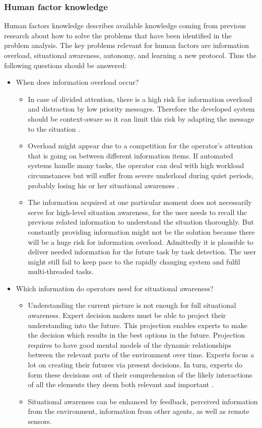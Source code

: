 \subsubsection{Human factor knowledge}
Human factors knowledge describes available knowledge coming from previous research about how to solve the problems that have been identified in the problem analysis. The key problems relevant for human factors are information overload, situational awareness, autonomy, and learning a new protocol. Thus the following questions should be answered:
\begin{itemize}
	\item When does information overload occur?
	\begin{itemize}
		\item In case of divided attention, there is a high risk for information overload and distraction by low priority messages. Therefore the developed system should be context-aware so it can limit this risk by adapting the message to the situation \cite{Arimura2001}.
		\item Overload might appear due to a competition for the operator’s attention that is going on between different information items. If automated systems handle many tasks, the operator can deal with high workload circumstances but will suffer from severe underload during quiet periods, probably losing his or her situational awareness \cite{Neerincx2008}.
		\item The information acquired at one particular moment does not necessarily serve for high-level situation awareness, for the user needs to recall the previous related information to understand the situation thoroughly. But constantly providing information might not be the solution because there will be a huge risk for information overload. Admittedly it is plausible to deliver needed information for the future task by task detection. The user might still fail to keep pace to the rapidly changing system and fulfil multi-threaded tasks\cite{Porathe2014}.
	\end{itemize}
	
	\item Which information do operators need for situational awareness?
	\begin{itemize}
		\item Understanding the current picture is not enough for full situational awareness. Expert decision makers must be able to project their understanding into the future. This projection enables experts to make the decision which results in the best options in the future. Projection requires to have good mental models of the dynamic relationships between the relevant parts of the environment over time. Experts focus a lot on creating their futures via present decisions. In turn, experts do form these decisions out of their comprehension of the likely interactions of all the elements they deem both relevant and important \cite{Gregory2010}.
		\item Situational awareness can be enhanced by feedback, perceived information from the environment, information from other agents, as well as remote sensors. \cite{Carver2007}
	\end{itemize}
	

\end{itemize}
